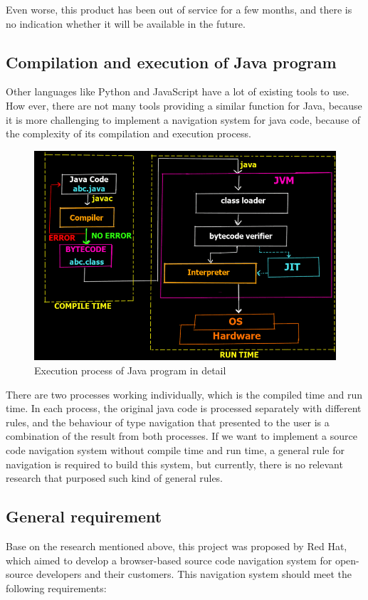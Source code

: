 \documentclass[runningheads]{llncs}
\begin{document}
Even worse, this product has been out of service for a few months, and there is no indication whether it will be available in the future.

\subsection{Compilation and execution of Java program}
Other languages like Python and JavaScript have a lot of existing tools to use. How ever, there are not many tools providing a similar function for Java, because it is more challenging to implement a navigation system for java code, because of the complexity of its compilation and execution process.

\begin{figure}[H]
	\centering
	\includegraphics[width=12cm]{pic/java-execution-process.png}
	\caption{Execution process of Java program in detail\cite{java-execution-process}}
	\label{Execution process of Java program in detail}
\end{figure}

There are two processes working individually, which is the compiled time and run time. In each process, the original java code is processed separately with different rules, and the behaviour of type navigation that presented to the user is a combination of the result from both processes. If we want to implement a source code navigation system without compile time and run time, a general rule for navigation is required to build this system, but currently, there is no relevant research that purposed such kind of general rules.

\subsection{General requirement}
Base on the research mentioned above, this project was proposed by Red Hat, which aimed to develop a browser-based source code navigation system for open-source developers and their customers. This navigation system should meet the following requirements:
\end{document}
